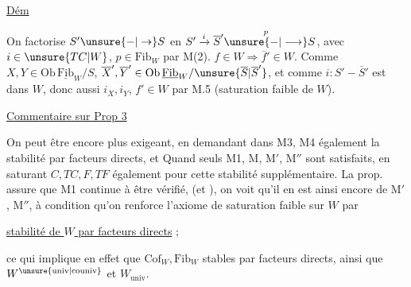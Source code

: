 
\uline{Dém}


On factorise $S'\unsure{-|\to}S$ en $S'\xrightarrow{i}\overline S'\overset{p}{\unsure{-|\longrightarrow}}S$, avec $i\in\unsure{TC|W}$, $p\in\mathrm{Fib}_W$ par M(2).   $f\in W\Rightarrow\overline f'\in W$. Comme $X,Y\in\mathrm{Ob}\,\underline{\mathrm{Fib}}_W/S$,  $\overline X',\overline Y'\in\mathrm{Ob}\,\underline{\mathrm{Fib}}_W/\unsure{\overline S|\overline S'}$, et comme  $i:S'-\overline S'$ est dans $W$, donc aussi $i_X,i_Y$,   $f'\in W$ par M.5 (saturation faible de $W$).

\uline{Commentaire sur Prop 3}

On peut être encore plus exigeant, en demandant dans M3, M4 également la stabilité par facteurs directs, et  Quand seuls M1, M, M$'$, M$''$ sont satisfaits, en saturant $C,TC,F,TF$ également pour cette stabilité supplémentaire. La prop.  assure  que M1 continue à être vérifié, (et  ), on voit qu'il en est ainsi encore de M$'$, M$''$, à condition qu'on renforce l'axiome de saturation faible  sur $W$ par

 \uline{stabilité de $W$ par facteurs directs} ;

ce qui implique en effet que $\mathrm{Cof}_W,\mathrm{Fib}_W$  stables par facteurs directs, ainsi que $W^{\unsure{\mathrm{univ}|\mathrm{couniv}}}$ et $W_{\mathrm{univ}}$.


